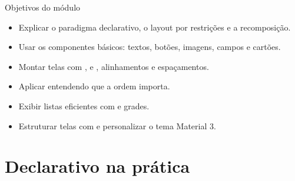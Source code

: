 \documentclass[aspectratio=169,10pt]{beamer}
\begin{document}
\capa

\begin{frame}{Objetivos do módulo}
  \begin{conceito}
    \begin{itemize}
      \item Explicar o paradigma declarativo, o layout por restrições e a recomposição.
      \item Usar os componentes básicos: textos, botões, imagens, campos e cartões.
      \item Montar telas com ,  e , alinhamentos e espaçamentos.
      \item Aplicar  entendendo que a ordem importa.
      \item Exibir listas eficientes com  e grades.
      \item Estruturar telas com  e personalizar o tema Material 3.
    \end{itemize}
  \end{conceito}
\end{frame}

\sumario



\section{Declarativo na prática}
\end{document}
